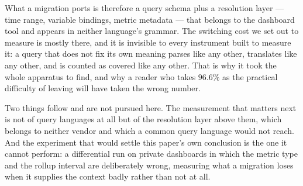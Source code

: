 What a migration ports is therefore a query schema plus a resolution layer --- time range,
variable bindings, metric metadata --- that belongs to the dashboard tool and appears in
neither language's grammar. The switching cost we set out to measure is mostly there, and
it is invisible to every instrument built to measure it: a query that does not fix its own
meaning parses like any other, translates like any other, and is counted as covered like
any other. That is why it took the whole apparatus to find, and why a reader who takes
$96.6\%$ as the practical difficulty of leaving will have taken the wrong number.

Two things follow and are not pursued here. The measurement that matters next is not of
query languages at all but of the resolution layer above them, which belongs to neither
vendor and which a common query language would not reach. And the experiment that would
settle this paper's own conclusion is the one it cannot perform: a differential run on
private dashboards in which the metric type and the rollup interval are deliberately wrong,
measuring what a migration loses when it supplies the context badly rather than not at
all.

